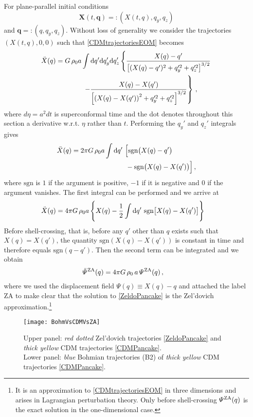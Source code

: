 \documentclass[twocolumn, nofootinbib, showpacs, superscriptaddress]{revtex4-1}
\renewcommand{\d}[0]{{\rm{d}}}
\newcommand{\vX}[0]{\bm{X} }
\newcommand{\vq}[0]{\bm{q} }
\begin{document}
For plane-parallel initial conditions $$\vX(t,\vq) =: (X(t,q), q_y, q_z)$$ and $\vq=:(q,q_y,q_z)$. 
 Without loss of generality we consider the trajectories $(X(t,q),0,0)$ such that \eqref{CDMtrajectoriesEOM} becomes
\begin{align} \label{1DCDMtrajectoriesEOM}
\ddot X(q)  &=  G\,\rho_0 a \int \d{q'} \d q'_y \d q'_z \left\{ \frac{X(q) - q'}{\left[(X(q)- q')^2 + q_y'^2 + q_z'^2\right]^{3/2}}\right. \notag\\  
& \qquad \qquad   \left.
- \frac{X(q) -X(q')}{\left[ \left(X(q)- X(q')\right)^2 + q_y'^2 + q_z'^2\right]^{3/2}}  \right\}\,, 
 \end{align}
 where $d \eta = a^2 dt $ is superconformal time and the dot denotes throughout this section a derivative w.r.t. $\eta$ rather than $t$. Performing the $q_y'$ and $q_z'$ integrals gives
 \begin{align}
 \ddot X(q)  &=  2 \pi G\,\rho_0 a \int \d q'\,\,  \Big[ \mathrm{sgn}\big(X(q) - q'\big) \notag \\
 & \qquad \qquad \qquad \qquad - \mathrm{sgn}\big(X(q) - X(q')\big)   \Big]\,,
 \end{align}
 where $\mathrm{sgn}$ is $1$ if the argument is positive, $-1$ if it is negative and $0$ if the argument vanishes. 
 The first integral can be performed and we arrive at 
  \begin{align}
 \ddot X(q)  &=  4 \pi G\,\rho_0 a\, \Bigg\{ 
  X(q) -  \frac{1}{2}\int \d q'\,\,  \mathrm{sgn}\big[X(q) - X(q') \big] \Bigg\} 
\label{CDM1DEOM}
 \end{align}
 Before shell-crossing, that is, before any $q'$ other than $q$ exists such that $X(q)=X(q')$, 
the quantity $\mathrm{sgn}(X(q) - X(q'))$ is constant in time and therefore equals $\mathrm{sgn}(q - q')$. Then the second term can be integrated and we obtain 
   \begin{align} \label{ZeldoPancake}
 \ddot \varPsi^{\rm ZA}(q)  &=  4 \pi G\,\rho_0\, a\, \varPsi^{\rm ZA}(q) \,,
 \end{align}
where we used the displacement field $\varPsi(q) \equiv X(q)-q$ and attached the label ZA to make clear that the solution to \eqref{ZeldoPancake} is the Zel'dovich approximation.\footnote{It is an approximation to \eqref{CDMtrajectoriesEOM} in three dimensions and arises in Lagrangian perturbation theory. 
Only before shell-crossing $\varPsi^{\rm ZA}(q)$ is the exact solution in the one-dimensional case.} 
%
\begin{figure}[t]
\texttt{[image: BohmVsCDMVsZA]}\\
\caption{Upper panel: \textit{red dotted} Zel'dovich trajectories \eqref{ZeldoPancake} and \textit{thick yellow} CDM trajectories  \eqref{CDMPancake}. 
 \\ 
 Lower panel: \textit{blue} Bohmian trajectories (B2) of \cite{UhlemannKoppHaugg2014} \textit{thick yellow} CDM trajectories \eqref{CDMPancake}. }
\label{fig:trajectories}
\end{figure}
\end{document}
